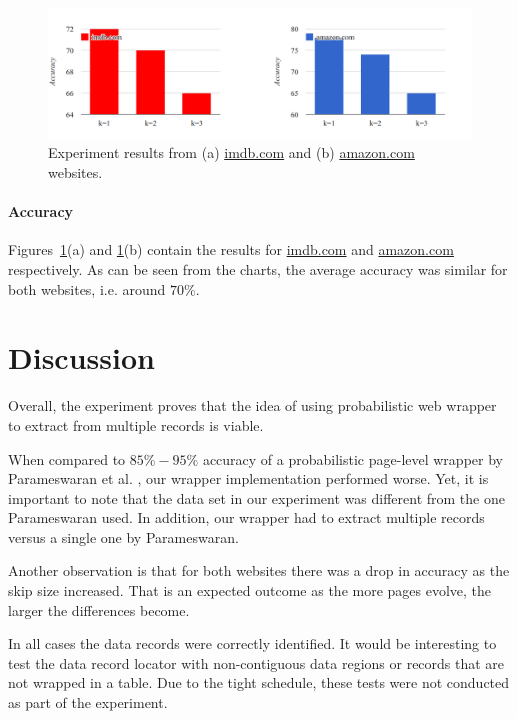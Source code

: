 \begin{figure}[h]
	\centering
	\includegraphics[width=1.0\textwidth]{figures/accuracy}
	\caption{Experiment results from (a) \url{imdb.com} and (b) \url{amazon.com} websites.}
	\label{fig:accuracy}
\end{figure}

\paragraph{Accuracy} Figures~\ref{fig:accuracy}(a) and \ref{fig:accuracy}(b) contain the results for \url{imdb.com} and \url{amazon.com} respectively. As can be seen from the charts, the average accuracy was similar for both websites, i.e. around $70\%$. 


\section{Discussion}

Overall, the experiment proves that the idea of using probabilistic web wrapper to extract from multiple records is viable.

When compared to $85\%-95\%$ accuracy of a probabilistic page-level wrapper by Parameswaran et al. \cite{DBLP:journals/pvldb/ParameswaranDGR11}, our wrapper implementation performed worse. Yet, it is important to note that the data set in our experiment was different from the one Parameswaran used. In addition, our wrapper had to extract multiple records versus a single one by Parameswaran.

Another observation is that for both websites there was a drop in accuracy as the skip size increased. That is an expected outcome as the more pages evolve, the larger the differences become.

In all cases the data records were correctly identified. It would be interesting to test the data record locator with non-contiguous data regions or records that are not wrapped in a table. Due to the tight schedule, these tests were not conducted as part of the experiment.


